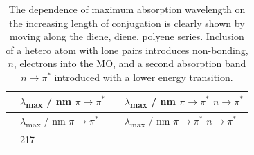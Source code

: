 \documentclass[
]{book}
\begin{document}
\begin{longtable}[]{@{}llll@{}}
\caption{\label{tab:lambdaconj} The dependence of maximum absorption wavelength on the increasing length of conjugation is clearly shown by moving along the diene, diene, polyene series. Inclusion of a hetero atom with lone pairs introduces non-bonding, \(n\), electrons into the MO, and a second absorption band \(n \longrightarrow \pi^\ast\) introduced with a lower energy transition.}\tabularnewline
\toprule
\begin{minipage}[b]{0.22\columnwidth}\raggedright
\strut
\end{minipage} & \begin{minipage}[b]{0.22\columnwidth}\raggedright
\(\lambda\)\textsubscript{max} / nm \(\pi \longrightarrow \pi^\ast\)\strut
\end{minipage} & \begin{minipage}[b]{0.22\columnwidth}\raggedright
\strut
\end{minipage} & \begin{minipage}[b]{0.22\columnwidth}\raggedright
\(\lambda\)\textsubscript{max} / nm \(\pi \longrightarrow \pi^\ast\) \(n \longrightarrow \pi^\ast\)\strut
\end{minipage}\tabularnewline
\midrule
\endfirsthead
\toprule
\begin{minipage}[b]{0.22\columnwidth}\raggedright
\strut
\end{minipage} & \begin{minipage}[b]{0.22\columnwidth}\raggedright
\(\lambda\)\textsubscript{max} / nm \(\pi \longrightarrow \pi^\ast\)\strut
\end{minipage} & \begin{minipage}[b]{0.22\columnwidth}\raggedright
\strut
\end{minipage} & \begin{minipage}[b]{0.22\columnwidth}\raggedright
\(\lambda\)\textsubscript{max} / nm \(\pi \longrightarrow \pi^\ast\) \(n \longrightarrow \pi^\ast\)\strut
\end{minipage}\tabularnewline
\midrule
\endhead
\begin{minipage}[t]{0.22\columnwidth}\raggedright
\strut
\end{minipage} & \begin{minipage}[t]{0.22\columnwidth}\raggedright
217\strut
\end{minipage} & \begin{minipage}[t]{0.22\columnwidth}\raggedright
\strut
\end{minipage} & \begin{minipage}[t]{0.22\columnwidth}\raggedright

\end{minipage}
\end{longtable}
\end{document}
